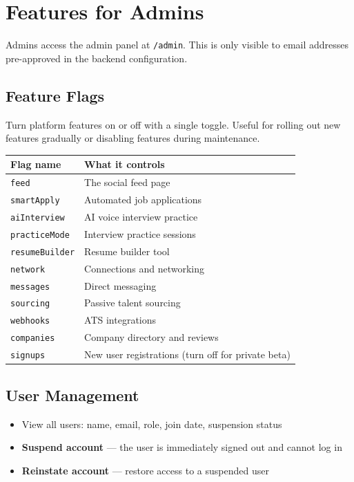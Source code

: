 \documentclass[12pt, a4paper]{report}
\newcommand{\code}[1]{\texttt{\small #1}}
\begin{document}
\chapter{Features for Admins}

Admins access the admin panel at \code{/admin}.
This is only visible to email addresses pre-approved in the backend configuration.

\section{Feature Flags}

Turn platform features on or off with a single toggle.  Useful for rolling out
new features gradually or disabling features during maintenance.

\begin{center}
\begin{tabularx}{\textwidth}{lX}
\toprule
\textbf{Flag name} & \textbf{What it controls} \\
\midrule
\code{feed}         & The social feed page \\
\code{smartApply}   & Automated job applications \\
\code{aiInterview}  & AI voice interview practice \\
\code{practiceMode} & Interview practice sessions \\
\code{resumeBuilder}& Resume builder tool \\
\code{network}      & Connections and networking \\
\code{messages}     & Direct messaging \\
\code{sourcing}     & Passive talent sourcing \\
\code{webhooks}     & ATS integrations \\
\code{companies}    & Company directory and reviews \\
\code{signups}      & New user registrations (turn off for private beta) \\
\bottomrule
\end{tabularx}
\end{center}

\section{User Management}

\begin{itemize}
  \item View all users: name, email, role, join date, suspension status
  \item \textbf{Suspend account} --- the user is immediately signed out and cannot log in
  \item \textbf{Reinstate account} --- restore access to a suspended user
\end{itemize}
\end{document}
